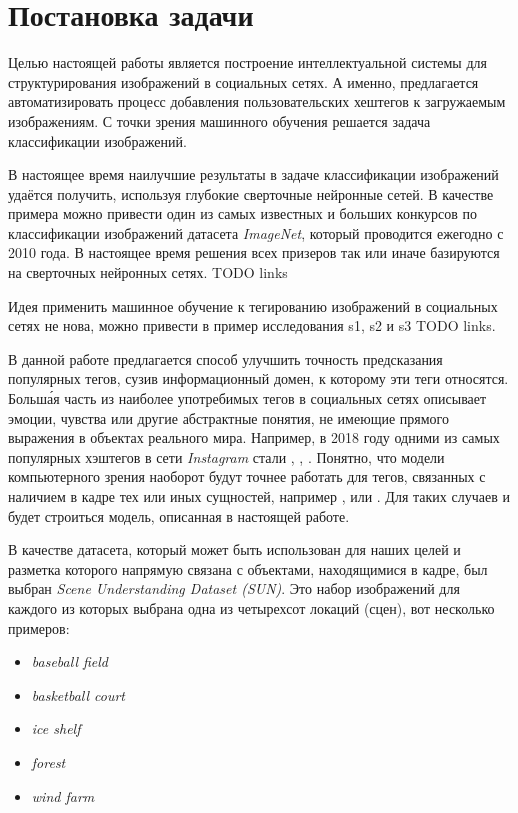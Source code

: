 \section{Постановка задачи}


\indent 
\indent
Целью настоящей работы является построение интеллектуальной системы для
структурирования изображений в социальных сетях. А именно, предлагается
автоматизировать процесс добавления пользовательских хештегов к загружаемым
изображениям. С точки зрения машинного обучения решается задача классификации изображений.

\indent
В настоящее время наилучшие результаты в задаче классификации изображений 
удаётся получить, используя глубокие сверточные нейронные сетей. В 
качестве примера можно привести один из самых известных и больших
конкурсов по классификации изображений датасета \textit{ImageNet}\cite{imagenet},
который проводится ежегодно с 2010 года. В настоящее время решения всех призеров 
так или иначе базируются на сверточных нейронных сетях. TODO links

\indent 
Идея применить машинное обучение к тегированию изображений в социальных
сетях не нова, можно привести в пример исследования s1, s2 и s3 TODO links. 
 

 \indent
 В данной работе предлагается способ улучшить точность предсказания
 популярных тегов, сузив информационный домен, к которому
 эти теги относятся.
 Больш\'{а}я часть из наиболее употребимых тегов в социальных сетях описывает
 эмоции, чувства или другие абстрактные понятия, не имеющие прямого выражения
 в объектах реального мира. Например, в 2018 году одними из самых популярных 
 хэштегов в сети \textit{Instagram} стали , ,
 . Понятно, что модели компьютерного зрения 
 наоборот будут точнее работать для тегов, связанных с наличием в кадре
 тех или иных сущностей, например
  ,  или . Для таких случаев и будет
  строиться модель, описанная в настоящей работе.

\indent  
  В качестве датасета, который может быть использован для наших целей и 
   разметка которого напрямую связана с объектами, 
  находящимися в кадре, был выбран \textit{Scene Understanding Dataset (SUN)}. 
Это набор изображений для каждого из которых выбрана одна
  из четырехсот локаций (сцен), вот несколько примеров:
  
\begin{itemize}
    \item \textit{baseball field}
    \item \textit{basketball court}
    \item \textit{ice shelf}
    \item \textit{forest}
    \item \textit{wind farm}
\end{itemize}

